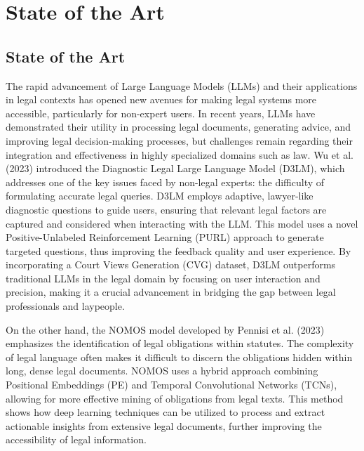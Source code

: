 \chapter{State of the Art}
\label{cha:sota}




\section{State of the Art}

The rapid advancement of Large Language Models (LLMs) and their 
applications in legal contexts has opened new avenues for making 
legal systems more accessible, particularly for non-expert users. 
In recent years, LLMs have demonstrated their utility in processing 
legal documents, generating advice, and improving legal 
decision-making processes, but challenges remain regarding their 
integration and effectiveness in highly specialized domains such as 
law.
Wu et al. (2023) introduced the Diagnostic Legal Large Language Model (D3LM), 
which addresses one of the key issues faced by non-legal experts: 
the difficulty of formulating accurate legal queries. D3LM employs 
adaptive, lawyer-like diagnostic questions to guide users, ensuring 
that relevant legal factors are captured and considered when interacting with the LLM. 
This model uses a novel Positive-Unlabeled Reinforcement Learning (PURL) approach to 
generate targeted questions, thus improving the feedback quality and user experience. 
By incorporating a Court Views Generation (CVG) dataset, 
D3LM outperforms traditional LLMs in the legal domain by focusing on user interaction 
and precision, making it a crucial advancement in bridging the gap between legal 
professionals and laypeople.

On the other hand, the NOMOS model developed by Pennisi et al. (2023) 
emphasizes the identification of legal obligations within statutes. 
The complexity of legal language often makes it difficult to discern the 
obligations hidden within long, dense legal documents. 
NOMOS uses a hybrid approach combining Positional Embeddings (PE) and 
Temporal Convolutional Networks (TCNs), allowing for more effective 
mining of obligations from legal texts. This method shows how deep 
learning techniques can be utilized to process and extract actionable 
insights from extensive legal documents, further improving the 
accessibility of legal information.

